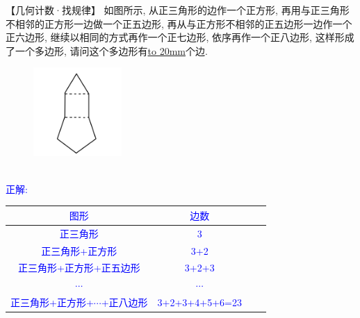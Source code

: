 \item {
    【几何计数·找规律】
    如图所示, 从正三角形的边作一个正方形, 再用与正三角形不相邻的正方形一边做一个正五边形, 再从与正方形不相邻的正五边形一边作一个正六边形, 继续以相同的方式再作一个正七边形, 依序再作一个正八边形, 这样形成了一个多边形, 请问这个多边形有\underline{\hbox to 20mm{}}个边. 
    \begin{figure}[H] 
        \centering
        \includegraphics[width=0.3\textwidth]{./pics/Chapter_4/2015_3.png}
    \end{figure}
    \ifshowSolution 
        \fangsong{}\textcolor{blue}{
            \\正解: \\
            \begin{tabular}{|c|c|c|c|}
                \hline
                $图形$ & $边数$ \\
                \hline
                正三角形 & 3 \\
                正三角形+正方形 & 3+2 \\
                正三角形+正方形+正五边形 & 3+2+3 \\
                $\cdots$ & $\cdots$ \\
                正三角形+正方形+$\cdots$+正八边形 & 3+2+3+4+5+6=23 \\
                \hline
            \end{tabular} \\
        }
    \else
        \vspace{1cm}
    \fi
}

